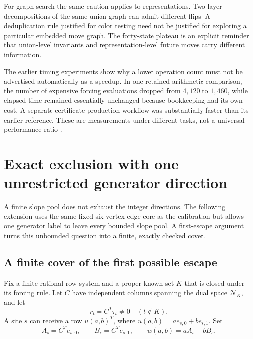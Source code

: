 \documentclass[11pt,letterpaper]{article}
\theoremstyle{definition}
\theoremstyle{remark}\newtheorem{remark}[theorem]{Remark}
\begin{document}
For graph search the same caution applies to representations. Two layer decompositions of the same union graph can admit different flips. A deduplication rule justified for color testing need not be justified for exploring a particular embedded move graph. The forty-state plateau is an explicit reminder that union-level invariants and representation-level future moves carry different information.

The earlier timing experiments show why a lower operation count must not be advertised automatically as a speedup. In one retained arithmetic comparison, the number of expensive forcing evaluations dropped from $4,120$ to $1,460$, while elapsed time remained essentially unchanged because bookkeeping had its own cost. A separate certificate-production workflow was substantially faster than its earlier reference. These are measurements under different tasks, not a universal performance ratio \cite{BeasleyStatus}.

\section{Exact exclusion with one unrestricted generator direction}\label{sec:parametric}
A finite slope pool does not exhaust the integer directions. The following extension uses the same fixed six-vertex edge core as the calibration but allows one generator label to leave every bounded slope pool. A first-escape argument turns this unbounded question into a finite, exactly checked cover.

\subsection{A finite cover of the first possible escape}
Fix a finite rational row system and a proper known set $K$ that is closed under its forcing rule. Let $C$ have independent columns spanning the dual space $\mathcal N_K$, and let
\[
r_t=C^T\tau_t\ne0\quad(t\notin K).
\]
A site $s$ can receive a row $u(a,b)^T$, where $u(a,b)=a e_{s,0}+b e_{s,1}$. Set
\[
A_s=C^Te_{s,0},\qquad B_s=C^Te_{s,1},\qquad
w(a,b)=aA_s+bB_s.
\]
\end{document}
